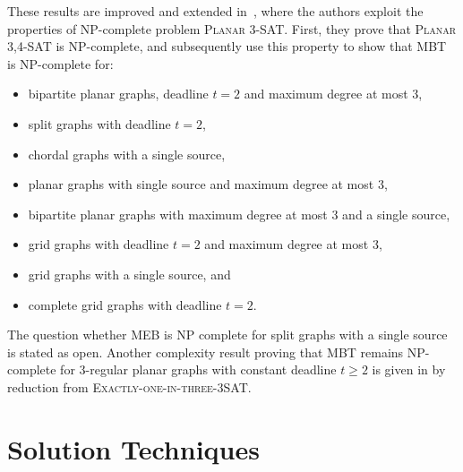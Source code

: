 These results are improved and extended in~\cite{jansen93}, where the authors exploit the properties of NP-complete problem \textsc{Planar 3-SAT}.
First, they prove that \textsc{Planar 3,4-SAT} is NP-complete, and subsequently use this property to show that MBT is NP-complete for:
\begin{itemize}
\item bipartite planar graphs, deadline $t=2$ and maximum degree at most 3,
\item split graphs with deadline $t=2$,
\item chordal graphs with a single source, 
\item planar graphs with single source and maximum degree at most 3, 
\item bipartite planar graphs with maximum degree at most 3 and a single source,
\item grid graphs with deadline $t=2$ and maximum degree at most 3,
\item grid graphs with a single source, and
\item complete grid graphs with deadline $t=2$. 
\end{itemize}
The question whether MEB is NP complete for split graphs with a single source is stated as open.
Another complexity result proving that MBT remains NP-complete for 3-regular planar graphs with constant deadline $t\geq 2$ 
is given in \cite{middendorf93} by reduction from \textsc{Exactly-one-in-three-3SAT}.

\section{Solution Techniques}
